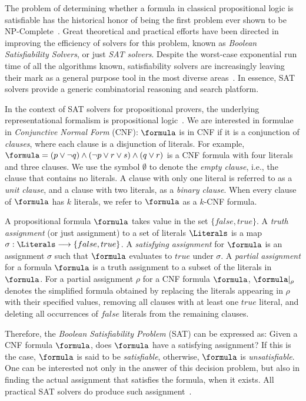 The problem of determining whether a formula in classical propositional logic is
satisfiable has the historical honor of being the first problem ever shown to be
NP-Complete~\cite{Cook}. Great theoretical and practical efforts have been
directed in improving the efficiency of solvers for this problem, known as
\emph{Boolean Satisfiability Solvers}, or just \emph{SAT solvers}. Despite the
worst-case exponential run time of all the algorithms known, satisfiability
solvers are increasingly leaving their mark as a general purpose tool in the
most diverse areas~\cite{satchapter}. In essence, SAT solvers provide a generic
combinatorial reasoning and search platform. 

In the context of SAT solvers for propositional provers, the underlying
representational formalism is propositional logic~\cite{satchapter}. We are
interested in formulae in \emph{Conjunctive Normal Form} (CNF): $\formula$ is in
CNF if it is a conjunction of \emph{clauses}, where each clause is a disjunction
of literals. For example, $\formula = (p \lor \neg q) \land (\neg p \lor r \lor
s) \land (q \lor r)$ is a CNF formula with four literals and three clauses. 
We use the symbol $\emptyset$ to denote the \emph{empty clause}, i.e., the
clause that contains no literals. A clause with only one literal is referred to
as a \emph{unit clause}, and a clause with two literals, as a \emph{binary
clause}.  When every clause of $\formula$ has $k$ literals, we refer to
$\formula$ as a $k$-CNF formula.  

A propositional formula $\formula$ takes value in the set $\{false, true\}$. A
\emph{truth assignment} (or just assignment) to a set of literals $\Literals$ is
a map $\sigma : \Literals \longrightarrow \{false, true\}$. A \emph{satisfying
assignment} for $\formula$ is an assignment $\sigma$ such that $\formula$
evaluates to $true$ under $\sigma$.  A \emph{partial assignment} for a formula
$\formula$ is a truth assignment to a subset of the literals in $\formula$. For
a partial assignment $\rho$ for a CNF formula $\formula$, $\formula|_\rho$
denotes the simplified formula obtained by replacing the literals appearing in
$\rho$ with their specified values, removing all clauses with at least one
$true$ literal, and deleting all occurrences of $false$ literals from the
remaining clauses.

Therefore, the \emph{Boolean Satisfiability Problem} (SAT) can be expressed as:
Given a CNF formula $\formula$, does $\formula$ have a satisfying assignment? If
this is the case, $\formula$ is said to be \emph{satisfiable}, otherwise,
$\formula$ is \emph{unsatisfiable}.  One can be interested not only in the
answer of this decision problem, but also in finding the actual assignment that
satisfies the formula, when it exists. All practical SAT solvers do produce such
assignment~\cite{cormen}. 

